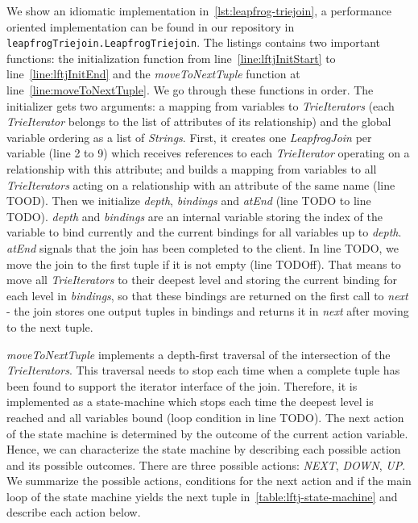 We show an idiomatic implementation in~\cref{lst:leapfrog-triejoin}, a performance oriented implementation can be found in our
repository in \texttt{leapfrogTriejoin.LeapfrogTriejoin}.
The listings contains two important functions: the initialization function from line~\ref{line:lftjInitStart} to line~\ref{line:lftjInitEnd} %
and the \textit{moveToNextTuple} function at line~\ref{line:moveToNextTuple}. %
We go through these functions in order.
The initializer gets two arguments: a mapping from variables to \textit{TrieIterators} (each \textit{TrieIterator} belongs to
the list of attributes of its relationship) and the global variable ordering as a list of \textit{Strings}.
First, it creates one \textit{LeapfrogJoin} per variable (line 2 to 9) which receives references %
to each \textit{TrieIterator} operating on a relationship with this attribute; and builds a mapping from variables to
all \textit{TrieIterators} acting on a relationship with an attribute of the same name (line TOOD). %
Then we initialize \textit{depth}, \textit{bindings} and \textit{atEnd} (line TODO to line TODO). %
\textit{depth} and \textit{bindings} are an internal variable storing the index of the variable to bind currently and the
current bindings for all variables up to \textit{depth}.
\textit{atEnd} signals that the join has been completed to the client.
In line TODO, we move the join to the first tuple if it is not empty (line TODOff). %
That means to move all \textit{TrieIterators} to their deepest level and storing the current binding for each level
in \textit{bindings}, so that these bindings are returned on the first call to \textit{next} - the join stores one output
tuples in bindings and returns it in \textit{next} after moving to the next tuple. %

\textit{moveToNextTuple} implements a depth-first traversal of the intersection of the \textit{TrieIterators}.
This traversal needs to stop each time when a complete tuple has been found to support the iterator interface of the join.
Therefore, it is implemented as a state-machine which stops each time the deepest level is reached and all variables bound
(loop condition in line TODO). %
The next action of the state machine is determined by the outcome of the current action variable.
Hence, we can characterize the state machine by describing each possible action and its possible outcomes.
There are three possible actions: \textit{NEXT}, \textit{DOWN}, \textit{UP}.
We summarize the possible actions, conditions for the next action and
if the main loop of the state machine yields the next tuple in~\cref{table:lftj-state-machine} and describe each action below.

